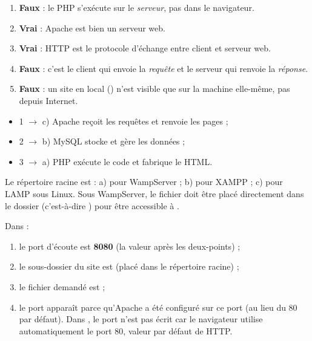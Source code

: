 \begin{enumerate}[label=\alph*)]
  \item \textbf{Faux} : le PHP s'exécute sur le \emph{serveur}, pas dans le navigateur.
  \item \textbf{Vrai} : Apache est bien un serveur web.
  \item \textbf{Vrai} : HTTP est le protocole d'échange entre client et serveur web.
  \item \textbf{Faux} : c'est le client qui envoie la \emph{requête} et le serveur qui
        renvoie la \emph{réponse}.
  \item \textbf{Faux} : un site en local () n'est visible que sur la
        machine elle-même, pas depuis Internet.
\end{enumerate}

\begin{itemize}
  \item 1 $\rightarrow$ c) Apache reçoit les requêtes et renvoie les pages ;
  \item 2 $\rightarrow$ b) MySQL stocke et gère les données ;
  \item 3 $\rightarrow$ a) PHP exécute le code et fabrique le HTML.
\end{itemize}

Le répertoire racine est : a)  pour WampServer ; b)  pour
XAMPP ; c)  pour LAMP sous Linux. Sous WampServer, le fichier
 doit être placé directement dans le dossier 
(c'est-à-dire )
pour être accessible à .

Dans  :
\begin{enumerate}[label=\alph*)]
  \item le port d'écoute est \textbf{8080} (la valeur après les deux-points) ;
  \item le sous-dossier du site est  (placé dans le répertoire racine) ;
  \item le fichier demandé est  ;
  \item le port  apparaît parce qu'Apache a été configuré sur ce port (au
        lieu du 80 par défaut). Dans , le port n'est pas écrit
        car le navigateur utilise automatiquement le port 80, valeur par défaut de HTTP.
\end{enumerate}

